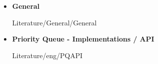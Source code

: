 \begin{frame}{\LectureFurtherLiterature}
  \begin{itemize}
    \item
      \textbf{General}
      \begin{btSect}{Literature/General/General}
        \btPrintAll
      \end{btSect}
  \end{itemize}
\end{frame}


\begin{frame}{\LectureFurtherLiterature}
  \begin{itemize}
    \item
      \textbf{Priority Queue - Implementations / API}
      \begin{btSect}{Literature/eng/PQAPI}
        \btPrintAll
      \end{btSect}
  \end{itemize}
\end{frame}